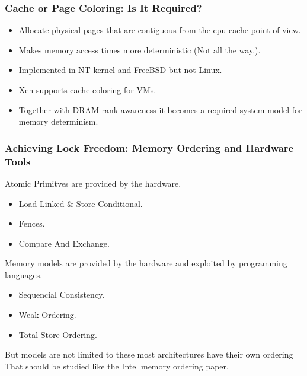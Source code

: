 \documentclass{beamer}
\begin{document}
\begin{frame}
    \frametitle{Cache or Page Coloring: Is It Required?}
    \begin{itemize}
        \item Allocate physical pages that are contiguous from the cpu cache
            point of view.
        \item Makes memory access times more deterministic (Not all the way.).
        \item Implemented in NT kernel and FreeBSD but not Linux.
        \item Xen supports cache coloring for VMs.
        \item Together with DRAM rank awareness it becomes a required
            system model for memory determinism.
    \end{itemize}
\end{frame}

\begin{frame}
    \frametitle{Achieving Lock Freedom: Memory Ordering and Hardware Tools}
    Atomic Primitves are provided by the hardware.
    \begin{itemize}
        \item Load-Linked \& Store-Conditional.
        \item Fences.
        \item Compare And Exchange.
    \end{itemize}
    Memory models are provided by the hardware and exploited by programming
    languages.
    \begin{itemize}
        \item Sequencial Consistency.
        \item Weak Ordering.
        \item Total Store Ordering.
    \end{itemize}
    But models are not limited to these most architectures have their own
    ordering That should be studied like the Intel memory ordering paper.
\end{frame}
\end{document}
